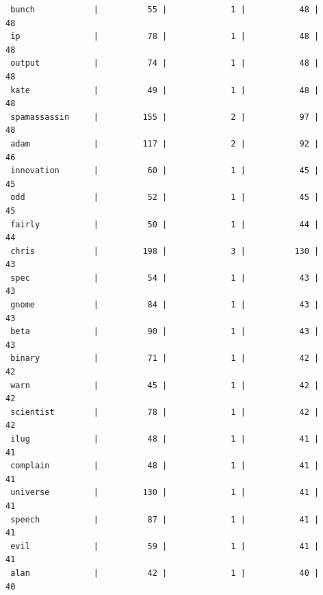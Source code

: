 \documentclass[a4paper,12pt]{article}
\begin{document}
\begin{verbatim}
 bunch            |          55 |             1 |           48 |             48
 ip               |          78 |             1 |           48 |             48
 output           |          74 |             1 |           48 |             48
 kate             |          49 |             1 |           48 |             48
 spamassassin     |         155 |             2 |           97 |             48
 adam             |         117 |             2 |           92 |             46
 innovation       |          60 |             1 |           45 |             45
 odd              |          52 |             1 |           45 |             45
 fairly           |          50 |             1 |           44 |             44
 chris            |         198 |             3 |          130 |             43
 spec             |          54 |             1 |           43 |             43
 gnome            |          84 |             1 |           43 |             43
 beta             |          90 |             1 |           43 |             43
 binary           |          71 |             1 |           42 |             42
 warn             |          45 |             1 |           42 |             42
 scientist        |          78 |             1 |           42 |             42
 ilug             |          48 |             1 |           41 |             41
 complain         |          48 |             1 |           41 |             41
 universe         |         130 |             1 |           41 |             41
 speech           |          87 |             1 |           41 |             41
 evil             |          59 |             1 |           41 |             41
 alan             |          42 |             1 |           40 |             40
	\end{verbatim}
	
\end{document}
